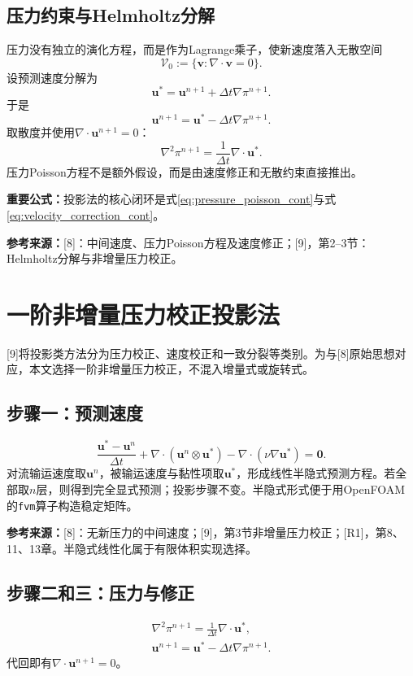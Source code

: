 \documentclass[UTF8,12pt,a4paper]{ctexart}
\numberwithin{equation}{section}
\newcommand{\dt}{\Delta t}
\newcommand{\Chorin}{\textnormal{[8]}}
\newcommand{\Guermond}{\textnormal{[9]}}
\newcommand{\Rone}{\textnormal{[R1]}}
\newcommand{\source}[1]{\par\smallskip\noindent\colorbox{sourcebg}{%
  \parbox{0.955\linewidth}{\footnotesize\color{sourcegray}\textbf{参考来源：}#1}}\par\smallskip}
\newcommand{\keytitle}[1]{\par\smallskip\noindent\colorbox{keybg}{%
  \parbox{0.965\linewidth}{\color{keyblue}\textbf{重要公式：}#1}}\par\smallskip}
\begin{document}
\subsection{压力约束与Helmholtz分解}
压力没有独立的演化方程，而是作为Lagrange乘子，使新速度落入无散空间
\[
  \mathcal V_0:=\{\bm v:\nabla\cdot\bm v=0\}.
\]
设预测速度分解为
\begin{equation}
  \bm u^*=\bm u^{n+1}+\dt\nabla\pi^{n+1}.
  \label{eq:helmholtz_scaled}
\end{equation}
于是
\begin{equation}
  \boxed{\bm u^{n+1}=\bm u^*-\dt\nabla\pi^{n+1}.}
  \label{eq:velocity_correction_cont}
\end{equation}
取散度并使用$\nabla\cdot\bm u^{n+1}=0$：
\begin{equation}
  \boxed{\nabla^2\pi^{n+1}=\frac{1}{\dt}\nabla\cdot\bm u^*.}
  \label{eq:pressure_poisson_cont}
\end{equation}
压力Poisson方程不是额外假设，而是由速度修正和无散约束直接推出。
\keytitle{投影法的核心闭环是式\eqref{eq:pressure_poisson_cont}与式\eqref{eq:velocity_correction_cont}。}
\source{\Chorin：中间速度、压力Poisson方程及速度修正；\Guermond，第2--3节：Helmholtz分解与非增量压力校正。}

\section{一阶非增量压力校正投影法}
\Guermond 将投影类方法分为压力校正、速度校正和一致分裂等类别。为与\Chorin 原始思想对应，本文选择一阶非增量压力校正，不混入增量式或旋转式。

\subsection{步骤一：预测速度}
\begin{equation}
  \boxed{\frac{\bm u^*-\bm u^n}{\dt}
  +\nabla\cdot(\bm u^n\otimes\bm u^*)
  -\nabla\cdot(\nu\nabla\bm u^*)=\bm0.}
  \label{eq:predictor_semiimplicit}
\end{equation}
对流输运速度取$\bm u^n$，被输运速度与黏性项取$\bm u^*$，形成线性半隐式预测方程。若全部取$n$层，则得到完全显式预测；投影步骤不变。半隐式形式便于用OpenFOAM的\texttt{fvm}算子构造稳定矩阵。
\source{\Chorin：无新压力的中间速度；\Guermond，第3节非增量压力校正；\Rone，第8、11、13章。半隐式线性化属于有限体积实现选择。}

\subsection{步骤二和三：压力与修正}
\begin{align}
  \boxed{\nabla^2\pi^{n+1}
  =\frac{1}{\dt}\nabla\cdot\bm u^*,}
  \label{eq:projection_poisson}\\
  \boxed{\bm u^{n+1}=\bm u^*-\dt\nabla\pi^{n+1}.}
  \label{eq:projection_corrector}
\end{align}
代回即有$\nabla\cdot\bm u^{n+1}=0$。
\end{document}
